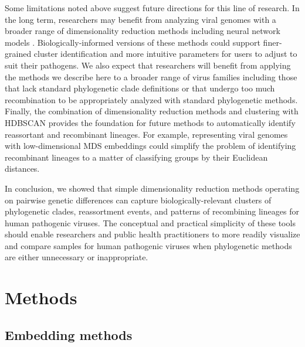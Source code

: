 \documentclass[webpdf,contemporary,large,single]{oup-authoring-template}%
\theoremstyle{thmstyleone}%
\theoremstyle{thmstyletwo}%
\theoremstyle{thmstylethree}%
\begin{document}
Some limitations noted above suggest future directions for this line of research.
In the long term, researchers may benefit from analyzing viral genomes with a broader range of dimensionality reduction methods including neural network models \citep{Kupperman2022,Chari2023}.
Biologically-informed versions of these methods could support finer-grained cluster identification and more intuitive parameters for users to adjust to suit their pathogens.
We also expect that researchers will benefit from applying the methods we describe here to a broader range of virus families including those that lack standard phylogenetic clade definitions or that undergo too much recombination to be appropriately analyzed with standard phylogenetic methods.
Finally, the combination of dimensionality reduction methods and clustering with HDBSCAN provides the foundation for future methods to automatically identify reassortant and recombinant lineages.
For example, representing viral genomes with low-dimensional MDS embeddings could simplify the problem of identifying recombinant lineages to a matter of classifying groups by their Euclidean distances.

In conclusion, we showed that simple dimensionality reduction methods operating on pairwise genetic differences can capture biologically-relevant clusters of phylogenetic clades, reassortment events, and patterns of recombining lineages for human pathogenic viruses.
The conceptual and practical simplicity of these tools should enable researchers and public health practitioners to more readily visualize and compare samples for human pathogenic viruses when phylogenetic methods are either unnecessary or inappropriate.

\section{Methods}

\subsection{Embedding methods}
\end{document}
